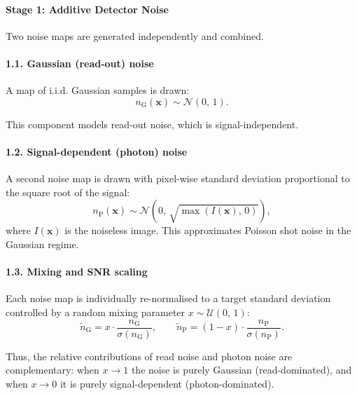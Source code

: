 \documentclass{aa}
\begin{document}
\paragraph{Stage 1: Additive Detector Noise}

Two noise maps are generated independently and combined.

\paragraph{1.1. Gaussian (read-out) noise}

A map of i.i.d. Gaussian samples is drawn:
\begin{equation}
n_\mathrm{G}(\mathbf{x}) \sim \mathcal{N}(0,\,1).
\end{equation}

This component models read-out noise, which is signal-independent.

\paragraph{1.2. Signal-dependent (photon) noise}

A second noise map is drawn with pixel-wise standard deviation proportional to the square root of the signal:
\begin{equation}
n_\mathrm{P}(\mathbf{x}) \sim \mathcal{N}\!\left(0,\, \sqrt{\max(I(\mathbf{x}),\,0)}\right),
\end{equation}
where $I(\mathbf{x})$ is the noiseless image. This approximates Poisson shot noise in the Gaussian regime.

\paragraph{1.3. Mixing and SNR scaling}

Each noise map is individually re-normalised to a target standard deviation controlled by a random mixing parameter $x \sim \mathcal{U}(0,\,1)$:
\begin{equation}
\tilde{n}_\mathrm{G} = x \cdot \frac{n_\mathrm{G}}{\sigma(n_\mathrm{G})}, 
\qquad
\tilde{n}_\mathrm{P} = (1 - x) \cdot \frac{n_\mathrm{P}}{\sigma(n_\mathrm{P})}.
\end{equation}

Thus, the relative contributions of read noise and photon noise are complementary: when $x \to 1$ the noise is purely Gaussian (read-dominated), and when $x \to 0$ it is purely signal-dependent (photon-dominated).
\end{document}
